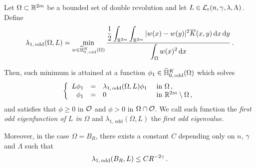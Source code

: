 \begin{lemma}
\label{Lemma:FirstOddEigenfunction}
Let $\Omega\subset \mathbb{R}^{2m} $ be a bounded set of double revolution and let $L\in \mathcal{L}_{\mathrm{r}}(n,\gamma,\lambda, \Lambda)$. Define 
\begin{equation}
\label{Eq:DefLambda1}
\lambda_{1, \, \mathrm{odd}}(\Omega, L) = \min_{w \in \widetilde{\mathbb{H}}^K_{0, \, \mathrm{odd}}(\Omega)} \dfrac{\dfrac{1}{2}  \displaystyle\int_{\mathbb{R}^{2m}} \int_{\mathbb{R}^{2m}} |w(x) - w(y)|^2 \overline{K}(x,y) \,\mathrm{d} x \,\mathrm{d} y}{ \displaystyle \int_\Omega w(x)^2 \,\mathrm{d} x}\,.
\end{equation}

Then, such minimum is attained at a function $\phi_1\in \widetilde{\mathbb{H}}^K_{0, \, \mathrm{odd}}(\Omega)$ which solves
$$
\left\{\begin{array}{rcll}
L\phi_1 &=& \lambda_{1, \, \mathrm{odd}}(\Omega, L) \phi_1 & \textrm{ in } \Omega\,,\\
\phi_1 & = & 0 & \textrm{ in } \mathbb{R}^{2m}\setminus \Omega\,,
\end{array} \right.
$$
and satisfies that $\phi \geq 0$ in $\mathcal{O}$ and $\phi > 0$ in $\Omega \cap \mathcal{O}$.
We call such function the \emph{first odd eigenfunction of $L$ in $\Omega$} and $\lambda_{1, \, \mathrm{odd}}(\Omega, L) $ the \emph{first odd eigenvalue}. 

Moreover, in the case $\Omega = B_R$, there exists a constant $C$ depending only on $n$, $\gamma$ and $\Lambda$ such that
$$
\lambda_{1, \, \mathrm{odd}}(B_R, L) \leq C R^{-2\gamma}\,. 
$$ 
\end{lemma}


